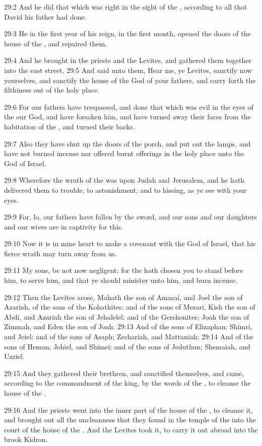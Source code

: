 29:2 And he did that which was right in the sight of the \LORD,
according to all that David his father had done.

29:3 He in the first year of his reign, in the first month, opened the
doors of the house of the \LORD, and repaired them.

29:4 And he brought in the priests and the Levites, and gathered them
together into the east street, 29:5 And said unto them, Hear me, ye
Levites, sanctify now yourselves, and sanctify the house of the \LORD
God of your fathers, and carry forth the filthiness out of the holy
place.

29:6 For our fathers have trespassed, and done that which was evil in
the eyes of the \LORD our God, and have forsaken him, and have turned
away their faces from the habitation of the \LORD, and turned their
backs.

29:7 Also they have shut up the doors of the porch, and put out the
lamps, and have not burned incense nor offered burnt offerings in the
holy place unto the God of Israel.

29:8 Wherefore the wrath of the \LORD was upon Judah and Jerusalem, and
he hath delivered them to trouble, to astonishment, and to hissing, as
ye see with your eyes.

29:9 For, lo, our fathers have fallen by the sword, and our sons and
our daughters and our wives are in captivity for this.

29:10 Now it is in mine heart to make a covenant with the \LORD God of
Israel, that his fierce wrath may turn away from us.

29:11 My sons, be not now negligent: for the \LORD hath chosen you to
stand before him, to serve him, and that ye should minister unto him,
and burn incense.

29:12 Then the Levites arose, Mahath the son of Amasai, and Joel the
son of Azariah, of the sons of the Kohathites: and of the sons of
Merari, Kish the son of Abdi, and Azariah the son of Jehalelel: and of
the Gershonites; Joah the son of Zimmah, and Eden the son of Joah:
29:13 And of the sons of Elizaphan; Shimri, and Jeiel: and of the sons
of Asaph; Zechariah, and Mattaniah: 29:14 And of the sons of Heman;
Jehiel, and Shimei: and of the sons of Jeduthun; Shemaiah, and Uzziel.

29:15 And they gathered their brethren, and sanctified themselves, and
came, according to the commandment of the king, by the words of the
\LORD, to cleanse the house of the \LORD.

29:16 And the priests went into the inner part of the house of the
\LORD, to cleanse it, and brought out all the uncleanness that they
found in the temple of the \LORD into the court of the house of the
\LORD. And the Levites took it, to carry it out abroad into the brook
Kidron.

